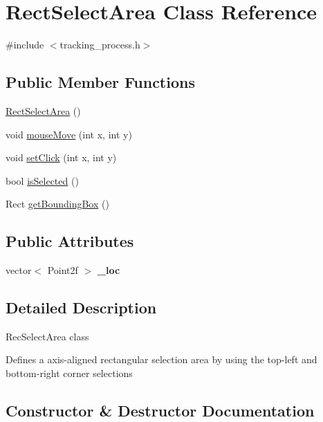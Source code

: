 \hypertarget{class_rect_select_area}{}\section{Rect\+Select\+Area Class Reference}
\label{class_rect_select_area}


{\ttfamily \#include $<$tracking\+\_\+process.\+h$>$}

\subsection*{Public Member Functions}
\begin{DoxyCompactItemize}
\item 
\hyperlink{class_rect_select_area_ad9997b0992c89405457b2adc75c685cd}{Rect\+Select\+Area} ()
\item 
void \hyperlink{class_rect_select_area_ab95e2ef179e1bd6659ab5d09aedab066}{mouse\+Move} (int x, int y)
\item 
void \hyperlink{class_rect_select_area_a3215429d108eb259c8b1c68d5a28af01}{set\+Click} (int x, int y)
\item 
bool \hyperlink{class_rect_select_area_a7a9ca80bf2125c894b94176ab42fefa1}{is\+Selected} ()
\item 
Rect \hyperlink{class_rect_select_area_a9e1cb4be9df22d4654a4b9221aac5496}{get\+Bounding\+Box} ()
\end{DoxyCompactItemize}
\subsection*{Public Attributes}
\begin{DoxyCompactItemize}
\item 
vector$<$ Point2f $>$ {\bfseries \+\_\+loc}\hypertarget{class_rect_select_area_a0fc2f938515d1507e4dfc75fcc2059f1}{}\label{class_rect_select_area_a0fc2f938515d1507e4dfc75fcc2059f1}

\end{DoxyCompactItemize}


\subsection{Detailed Description}
Rec\+Select\+Area class

Defines a axis-\/aligned rectangular selection area by using the top-\/left and bottom-\/right corner selections 

\subsection{Constructor \& Destructor Documentation}
